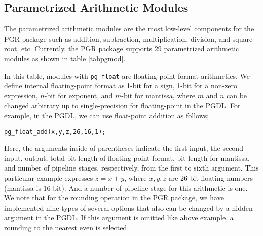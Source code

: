 \documentclass{llncs}
\begin{document}
\subsection{Parametrized Arithmetic Modules}
The parametrized arithmetic modules are the most low-level components
for the PGR package such as addition, subtraction, 
multiplication, division, and square-root, etc. 
Currently, the PGR package supports
29 parametrized arithmetic modules as shown in table \ref{tabpgmod}.

In this table, modules with {\tt pg\_float} are floating point format arithmetics.
We define internal floating-point format as 1-bit for a sign, 
1-bit for a non-zero expression, $n$-bit for exponent, 
and $m$-bit for mantissa, where $m$ and $n$ can be 
changed arbitrary up to single-precision for floating-point in the PGDL.
For example, in the PGDL, we can use float-point addition
as follows;
\begin{verbatim}
pg_float_add(x,y,z,26,16,1);
\end{verbatim}
Here, the arguments inside of parentheses indicate
the first input, the second input, output, total bit-length
of floating-point format, bit-length for mantissa,
and number of pipeline stages, respectively,
from the first to sixth argument.
This particular example expresses 
$z = x + y$, where $x,y,z$ are 26-bit floating numbers (mantissa is 16-bit).
And a number of pipeline stage for this arithmetic is one.
We note that for the rounding operation in the PGR package,
we have implemented nine types of several options that
also can be changed by a hidden argument in the PGDL.
If this argument is omitted like above example, 
a rounding to the nearest even is selected.
\end{document}
